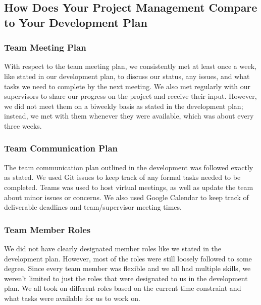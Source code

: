 \documentclass{article}
\begin{document}

\subsection{How Does Your Project Management Compare to Your Development Plan}


\subsubsection{Team Meeting Plan}
With respect to the team meeting plan, we consistently met at least once a week, like stated in our 
development plan, to discuss our status, any issues, and what tasks we need to complete by the next 
meeting. We also met regularly with our supervisors to share our progress on the project and receive 
their input. However, we did not meet them on a biweekly basis as stated in the development plan; 
instead, we met with them whenever they were available, which was about every three weeks.

\subsubsection{Team Communication Plan}
The team communication plan outlined in the development was followed exactly as stated. We used Git 
issues to keep track of any formal tasks needed to be completed. Teams was used to host virtual 
meetings, as well as update the team about minor issues or concerns. We also used Google Calendar to 
keep track of deliverable deadlines and team/supervisor meeting times.

\subsubsection{Team Member Roles}
We did not have clearly designated member roles like we stated in the development plan. However, most 
of the roles were still loosely followed to some degree. Since every team member was flexible and we 
all had multiple skills, we weren't limited to just the roles that were designated to us in the 
development plan. We all took on different roles based on the current time constraint and what tasks 
were available for us to work on.
\end{document}
